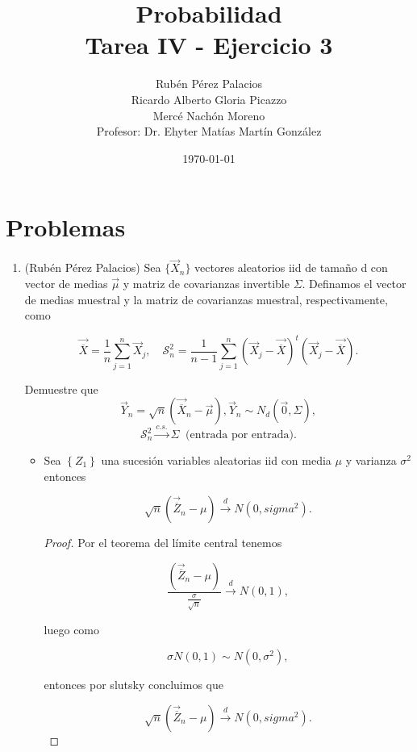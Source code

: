 \documentclass[letterpaper]{article}
\title{Probabilidad \\Tarea IV - Ejercicio 3}
\author{Rubén Pérez Palacios\\Ricardo Alberto Gloria Picazzo\\Mercé Nachón Moreno\\Profesor: Dr. Ehyter Matías Martín González}
\date{\today}
\theoremstyle{definition}
\theoremstyle{lemathm}
\theoremstyle{lemademthm}
\newcommand{\pars}[1]{\left( #1 \right) }
\newcommand{\set}[1]{\left \{ #1 \right\} }
\newcommand{\1}{\mathbbm{1}}
\begin{document}
	\maketitle
    
    \section*{Problemas}

    \begin{enumerate}
		
		\item (Rubén Pérez Palacios) Sea $\{\vec{X}_n\}$ vectores aleatorios iid de tamaño d con vector de medias $\vec{\mu}$ y matriz de covarianzas invertible $\Sigma$. Definamos el vector de medias muestral y la matriz de covarianzas muestral, respectivamente, como

        \[\vec{\overline{X}}=\frac{1}{n}\sum\limits_{j=1}^n \vec{X}_j,\quad \mathcal{S}_n^2=\frac{1}{n-1}\sum\limits_{j=1}^n\pars{\vec{X}_j-\vec{\overline{X}}}^t\pars{\vec{X}_j-\vec{\overline{X}}}.\]
        
        Demuestre que 
        \[\vec{Y}_n = \sqrt{n}\pars{\vec{\overline{X}}_n-\vec{\mu}}, \vec{Y}_n \sim N_d(\vec{0},\Sigma),\]
        \[\mathcal{S}_n^2\overset{c.s.}{\to} \Sigma\ \text{ (entrada por entrada)}.\]
        
        \begin{itemize}
        
            \item Sea $\set{Z_1}$ una sucesión variables aleatorias iid con media $\mu$ y varianza $\sigma^2$ entonces
			
			\[\sqrt{n}\pars{\vec{\overline{Z}}_n-\mu} \overset{d}{\to} N\pars{0,sigma^2}.\]

			\begin{proof}
				Por el teorema del límite central tenemos

				\[\frac{\pars{\vec{\overline{Z}}_n-\mu}}{\frac{\sigma}{\sqrt{n}}} \overset{d}{\to} N\pars{0,1},\]

				luego como

				\[\sigma N\pars{0,1} \sim N\pars{0,\sigma^2},\]

				entonces por slutsky concluimos que

				\[\sqrt{n}\pars{\vec{\overline{Z}}_n-\mu} \overset{d}{\to} N\pars{0,sigma^2}.\]
			\end{proof}
            
            \newpage
            

\end{itemize}
\end{enumerate}
\end{document}
